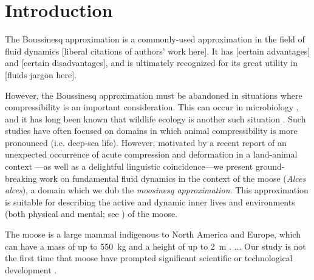 \section{Introduction}
\label{sec:introduction}

The Boussinesq approximation is a commonly-used approximation in the field of fluid dynamics [liberal citations of authors' work here].
It has [certain advantages] and [certain disadvantages], and is ultimately recognized for its great utility in [fluids jargon here].

However, the Boussinesq approximation must be abandoned in situations where compressibility is an important consideration.
This can occur in microbiology \citep{Ravetto2014}, and it has long been known that wildlife ecology is another such situation \citep[e.g.][]{Enright1963}.
Such studies have often focused on domains in which animal compressibility is more pronounced (i.e. deep-sea life).
However, motivated by a recent report of an unexpected occurrence of acute compression and deformation in a land-animal context \citep{Gudmannsson2018}---as well as a delightful linguistic coincidence---we present ground-breaking work on fundamental fluid dynamics in the context of the moose (\textit{Alces alces}), a domain which we dub the \textit{moosinesq approximation}.
This approximation is suitable for describing the active and dynamic inner lives and environments (both physical and mental; see \citealp{Gibson2015}) of the moose.

The moose is a large mammal indigenous to North America and Europe, which can have a mass of up to 550~kg and a height of up to 2~m \citep{CPWmoose}.
...
Our study is not the first time that moose have prompted significant scientific or technological development \citep[see, e.g.,][]{Handel2009}.
